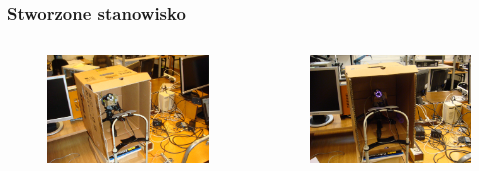 \documentclass{beamer}
\begin{document}

\begin{frame}
\frametitle{Stworzone stanowisko}
\begin{columns}
		\begin{figure}
		\begin{center}
		\includegraphics[scale=0.05]{stanowisko1.jpg}
		\end{center}
		\end{figure}
		\begin{figure}
		\begin{center}
		\includegraphics[scale=0.05]{stanowisko2.jpg}
		\end{center}
		\end{figure}
\end{columns}\end{frame}
\end{document}
